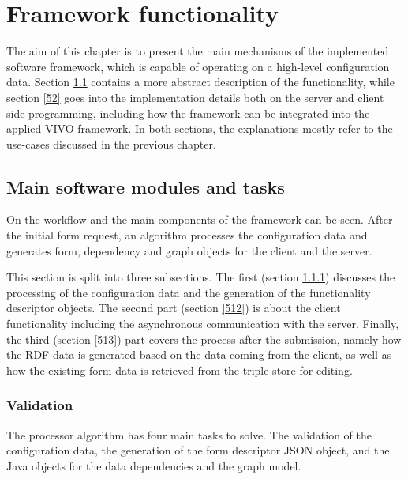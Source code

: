 
\chapter{Framework functionality} \label{5}

The aim of this chapter is to present the main mechanisms of the implemented software framework, which is capable of operating on a high-level configuration data. Section \ref{51} contains a more abstract description of the functionality, while section \ref{52} goes into the implementation details both on the server and client side programming, including how the framework can be integrated into the applied VIVO framework. In both sections, the explanations mostly refer to the use-cases discussed in the previous chapter.

\section{Main software modules and tasks} \label{51}

On  the workflow and the main components of the framework can be seen. After the initial form request, an algorithm processes the configuration data and generates form, dependency and graph objects for the client and the server.


This section is split into three subsections. The first (section \ref{511}) discusses the processing of the configuration data and the generation of the functionality descriptor objects. The second part (section \ref{512}) is about the client functionality including the asynchronous communication with the server. Finally, the third (section \ref{513}) part covers the process after the submission, namely how the RDF data is generated based on the data coming from the client, as well as how the existing form data is retrieved from the triple store for editing.

\subsection{Validation} \label{511}

The processor algorithm has four main tasks to solve. The validation of the configuration data, the generation of the form descriptor JSON object, and the Java objects for the data dependencies and the graph model. 


